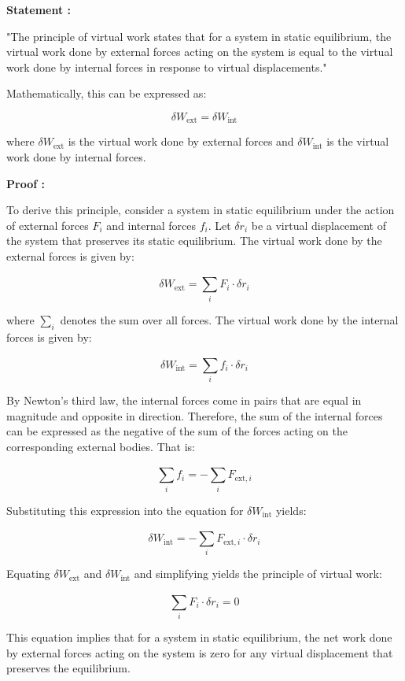 \documentclass[12pt, a4paper]{article} %
\begin{document}
\BgThispage

{\bf Statement :}

"The principle of virtual work states that for a system in static equilibrium, the virtual work done by external forces acting on the system is equal to the virtual work done by internal forces in response to virtual displacements."

Mathematically, this can be expressed as:

\[\boxed{\delta W_{\mbox{ext}} = \delta W_{\mbox{int}}}\]

where $\delta W_{\mbox{ext}}$ is the virtual work done by external forces and $\delta W_{\mbox{int}}$ is the virtual work done by internal forces.

{\bf Proof :}

To derive this principle, consider a system in static equilibrium under the action of external forces $F_i$ and internal forces $\displaystyle f_i$. Let $\delta r_i$ be a virtual displacement of the system that preserves its static equilibrium. The virtual work done by the external forces is given by:

\[\delta W_{\mbox{ext}} = \sum_{i}^{} F_i \cdot \delta r_i\]

where $\displaystyle \sum_{i}^{}$ denotes the sum over all forces. The virtual work done by the internal forces is given by:

\[\delta W_{\mbox{int}} = \sum_{i}^{} f_i \cdot \delta r_i\]

By Newton's third law, the internal forces come in pairs that are equal in magnitude and opposite in direction. Therefore, the sum of the internal forces can be expressed as the negative of the sum of the forces acting on the corresponding external bodies. That is:

\[\sum_{i}^{} f_i = -\sum_{i}^{} F_{\mbox{ext}, i}\]

Substituting this expression into the equation for $\delta W_{\mbox{int}}$ yields:

\[\delta W_{\mbox{int}} = -\sum_{i}^{} F_{\mbox{ext}, i} \cdot \delta r_i\]

Equating $\delta W_{\mbox{ext}}$ and $\delta W_{\mbox{int}}$ and simplifying yields the principle of virtual work:

\[\sum_{i}^{} F_i \cdot \delta r_i = 0\]

This equation implies that for a system in static equilibrium, the net work done by external forces acting on the system is zero for any virtual displacement that preserves the equilibrium.
\end{document}
